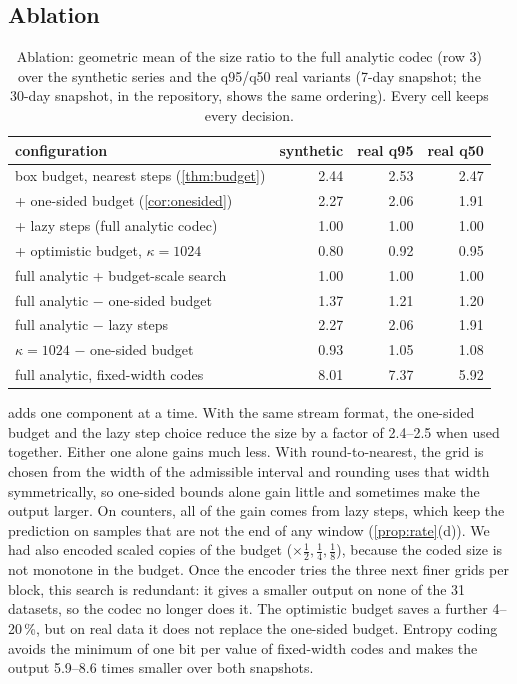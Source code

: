 \subsection{Ablation}
\label{sec:ablation}

\begin{table}[t]
\centering
\caption{Ablation: geometric mean of the size ratio to the full analytic
codec (row 3) over the synthetic series and the q95/q50 real variants
(7-day snapshot; the 30-day snapshot, in the repository, shows the same
ordering). Every cell keeps every
decision.}
\label{tab:ablation}
\begin{tabular}{lrrr}
\toprule
configuration & synthetic & real q95 & real q50 \\
\midrule
box budget, nearest steps (\cref{thm:budget}) & 2.44 & 2.53 & 2.47 \\
\quad + one-sided budget (\cref{cor:onesided}) & 2.27 & 2.06 & 1.91 \\
\quad + lazy steps (full analytic codec) & 1.00 & 1.00 & 1.00 \\
\quad + optimistic budget, $\kappa = 1024$ & 0.80 & 0.92 & 0.95 \\
full analytic + budget-scale search & 1.00 & 1.00 & 1.00 \\
full analytic $-$ one-sided budget & 1.37 & 1.21 & 1.20 \\
full analytic $-$ lazy steps & 2.27 & 2.06 & 1.91 \\
$\kappa = 1024$ $-$ one-sided budget & 0.93 & 1.05 & 1.08 \\
full analytic, fixed-width codes & 8.01 & 7.37 & 5.92 \\
\bottomrule
\end{tabular}
\end{table}

 adds one component at a time. With the same stream
format, the one-sided budget and the lazy step choice reduce the size by
a factor of 2.4--2.5 when used together. Either one alone gains much
less. With round-to-nearest, the grid is chosen from the width of the
admissible interval and rounding uses that width symmetrically, so
one-sided bounds alone gain little and sometimes make the output larger.
On counters, all of the gain comes from lazy steps, which keep the
prediction on samples that are not the end of any window
(\cref{prop:rate}(d)). We had also encoded scaled copies of the budget
($\times\frac12, \frac14, \frac18$), because the coded size is not
monotone in the budget. Once the encoder tries the three next finer grids
per block, this search is redundant: it gives a smaller output on none of
the 31 datasets, so the codec no longer does it. The optimistic budget
saves a further 4--20\,\%, but on real data it does not replace the
one-sided budget. Entropy coding avoids the minimum of one bit per value
of fixed-width codes and makes the output 5.9--8.6 times smaller over
both snapshots.

